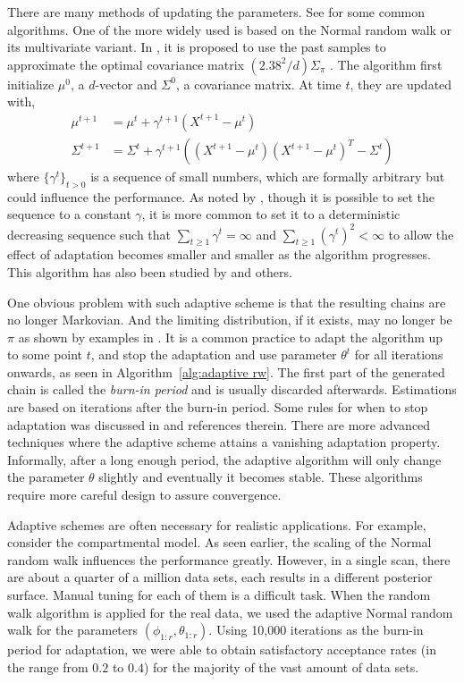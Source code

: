 There are many methods of updating the parameters. See \cite{Andrieu:2008kh} for some common algorithms. One of the more widely used is based on the Normal random walk or its multivariate variant. In \cite{Haario:1999dh,Haario:2001gu}, it is proposed to use the past samples to approximate the optimal covariance matrix $(2.38^2/d)\Sigma_{\pi}$ \cite{Gelman:1995vx}. The algorithm first initialize $\mu^0$, a $d$-vector and $\Sigma^0$, a covariance matrix. At time $t$, they are updated with,
\begin{align}
  \mu^{t+1} &= \mu^t + \gamma^{t+1} (X^{t+1} - \mu^t) \\
  \Sigma^{t+1} &= \Sigma^t + \gamma^{t+1}((X^{t+1} - \mu^t)(X^{t+1} - \mu^t)^T
  - \Sigma^t)
\end{align}
where $\{\gamma^t\}_{t>0}$ is a sequence of small numbers, which are formally arbitrary but could influence the performance. As noted by \cite{Andrieu:2008kh}, though it is possible to set the sequence to a constant $\gamma$, it is more common to set it to a deterministic decreasing sequence such that $\sum_{t\ge1}\gamma^t = \infty$ and $\sum_{t\ge1}(\gamma^t)^2<\infty$ to allow the effect of adaptation becomes smaller and smaller as the algorithm progresses. This algorithm has also been studied by \cite{Andrieu:2006tw} and others.

One obvious problem with such adaptive scheme is that the resulting chains are no longer Markovian. And the limiting distribution, if it exists, may no longer be $\pi$ as shown by examples in \cite{Andrieu:2008kh}. It is a common practice to adapt the algorithm up to some point $t$, and stop the adaptation and use parameter $\theta^t$ for all iterations onwards, as seen in Algorithm~\ref{alg:adaptive rw}. The first part of the generated chain is called the \emph{burn-in period} and is usually discarded afterwards. Estimations are based on iterations after the burn-in period. Some rules for when to stop adaptation was discussed in \cite{Andrieu:2008kh} and references therein. There are more advanced techniques where the adaptive scheme attains a vanishing adaptation property. Informally, after a long enough period, the adaptive algorithm will only change the parameter $\theta$ slightly and eventually it becomes stable. These algorithms require more careful design to assure convergence.

Adaptive schemes are often necessary for realistic applications. For example, consider the \pet compartmental model. As seen earlier, the scaling of the Normal random walk influences the performance greatly. However, in a single \pet scan, there are about a quarter of a million data sets, each results in a different posterior surface. Manual tuning for each of them is a difficult task. When the random walk algorithm is applied for the real data, we used the adaptive Normal random walk for the parameters $(\phi_{1:r},\theta_{1:r})$. Using 10,000 iterations as the burn-in period for adaptation, we were able to obtain satisfactory acceptance rates (in the range from $0.2$ to $0.4$) for the majority of the vast amount of data sets.


